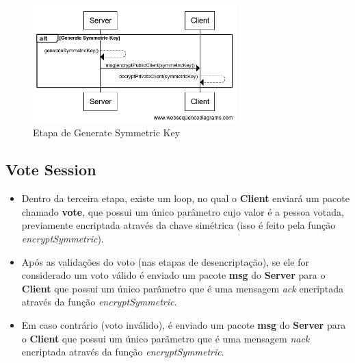 \documentclass[10pt]{article}
\begin{document}
    \begin{figure}[ht]
    \centerline{\includegraphics[width=0.7\textwidth]{diagrama/generateSymmetric.png}}
    \caption{Etapa de Generate Symmetric Key}
    \label{fig:symmetric}
    \end{figure}
    
    \subsection{Vote Session}
    \begin{itemize}
    \item Dentro da terceira etapa, existe um loop, no qual o \textbf{Client} enviará um pacote chamado \textbf{vote}, que possui um único parâmetro cujo valor é a pessoa votada, previamente encriptada através da chave simétrica (isso é feito pela função \textit{encryptSymmetric}).
    \item Após as validações do voto (nas etapas de desencriptação), se ele for considerado um voto válido é enviado um pacote \textbf{msg} do \textbf{Server} para o \textbf{Client} que possui um único parâmetro que é uma mensagem \textit{ack} encriptada através da função \textit{encryptSymmetric}.
    \item Em caso contrário (voto inválido), é enviado um pacote \textbf{msg} do \textbf{Server} para o \textbf{Client} que possui um único parãmetro que é uma mensagem \textit{nack} encriptada através da função \textit{encryptSymmetric}.
    \end{itemize}
    
\end{document}
